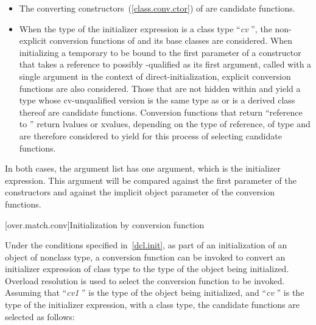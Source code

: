 \begin{itemize}
\item
The converting constructors~(\ref{class.conv.ctor}) of
are candidate functions.
\item
When the type of the initializer expression is a class type
``\textit{cv} '',
the non-explicit conversion functions of
and its base classes are considered.
When initializing a temporary to be bound to the first parameter of a
constructor
that takes a reference to possibly \cv-qualified  as its first argument,
called with a single argument in the context of
direct-initialization, explicit conversion functions are also considered.
Those that are not hidden within
and yield a type whose cv-unqualified version is the same type as
or is a derived class thereof
are candidate functions.
Conversion functions that return ``reference to
''
return
lvalues or xvalues, depending on the type of reference, of type
and are therefore considered to yield
for this
process of selecting candidate functions.
\end{itemize}

\pnum
In both cases, the argument list has one argument, which is the initializer
expression.
\enternote
This argument will be compared against
the first parameter of the constructors and against the implicit
object parameter of the conversion functions.
\exitnote

[over.match.conv]{Initialization by conversion function}%

\pnum
Under the conditions specified in~\ref{dcl.init}, as
part of an initialization of an object of nonclass type,
a conversion function can be invoked to convert an initializer
expression of class type to the type of the object
being initialized.
Overload resolution is used to select the
conversion function to be invoked.
Assuming that ``\textit{cv1} '' is the
type of the object being initialized, and ``\textit{cv} '' is the type
of the initializer expression, with
a class type,
the candidate functions are selected as follows:

